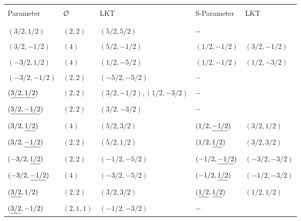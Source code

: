 \documentclass[11pt ,reqno]{amsart}
\begin{document}
{\begin{example*}[$Mp(4,\bb R)$]
\medskip
\begin{tabular}{|l|l|l|l|l|}
  \hline
  &&&&\\
  Parameter&$\mathcal O$&LKT&S-Parameter&LKT\\
  &&&&\\
  \hline
  &&&&\\
  $(3/2,1/2)$&$(2,2)$&$(5/2,5/2)$&$-$&\\
  &&&&\\ %
  $(3/2,-1/2)$&$(4)$&$(5/2,-1/2)$&$(1/2,-1/2)$ &$(3/2,-1/2)$\\
  &&&&\\ %
$(-3/2,1/2)$&$(4)$&$(1/2,-5/2)$&$(1/2,-1/2)$ &$(1/2,-3/2)$\\
  &&&&\\ %
  $(-3/2,-1/2)$&$(2,2)$&$(-5/2,-5/2)$&$-$&\\
  &&&&\\ %
  $({\underline{3/2,1/2}})$&$(2,2)$&$(3/2,-1/2),(1/2,-3/2)$&$-$ &\\
  &&&&\\ %
  $({\underline{3/2,-1/2}})$&$(2,2)$&$(3/2,-3/2)$&$-$ &\\
   &&&&\\ %
  $(3/2,{\underline{1/2}})$&$(4)$&$(5/2,3/2)$&$(1/2,{\underline{-1/2}})$ &$(3/2,1/2)$\\
  &&&&\\ %
  $(3/2,{\underline{-1/2}})$&$(2,2)$&$(5/2,1/2)$&$(1/2,{\underline{1/2}})$ &$(3/2,3/2)$\\
  &&&&\\ %
  $({-3/2},{\underline{1/2}})$&$(2,2)$&$(-1/2,-5/2)$&$(-1/2,{\underline{-1/2}})$ &$(-3/2,-3/2)$\\
  &&&&\\ %
  $(-3/2,{\underline{-1/2}})$&$(4)$&$(-3/2,-5/2)$&$(-1/2,{\underline{1/2}})$ &$(-1/2,-3/2)$\\
  &&&&\\ %
  $({\underline{3/2}},1/2)$&$(2,2)$&$(3/2,3/2)$&$({\underline{1/2}},{\underline{1/2}})$ &$(1/2,1/2)$\\
  &&&&\\ %
  $({\underline{3/2}},-1/2)$&$(2,1,1)$&$(-1/2,-3/2)$&$-$ &\\

\end{tabular}
\end{example*}}
\end{document}
